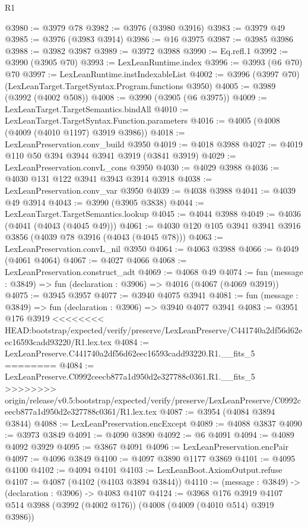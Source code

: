 \begin{lexlean}{R1}
\begin{coremodule}
{{{{{{{{{{{{{{{{{{{{{{{{{{{{{{{{{{{{{{{{{{{{{{{{{{{{{{{{{{{{{{{{{{{{{{{{{{{{{{{{{{{{{{{{{{{{{{{{{{{{{{{{{{{{{{{{{{{{{{{{{{{{{{{{{{{{{{{{{{{{{{{{{{{{{{{{{{{{{{{{{{{{{{{{{{{{{{{{{{{{{{{{{{@3980 := @3979 @78
@3982 := @3976 (@3980 @3916)
@3983 := @3979 @49
@3985 := @3976 (@3983 @3914)
@3986 := @16 @3975
@3987 := @3985 @3986
@3988 := @3982 @3987
@3989 := @3972 @3988
@3990 := Eq.refl.{1}
@3992 := @3990 (@3905 @70)
@3993 := LexLeanRuntime.index
@3996 := @3993 (@6 @70) @70
@3997 := LexLeanRuntime.instIndexableList
@4002 := @3996 (@3997 @70) (LexLeanTarget.TargetSyntax.Program.functions @3950)
@4005 := @3989 (@3992 (@4002 @508))
@4008 := @3990 (@3905 (@6 @3975))
@4009 := LexLeanTarget.TargetSemantics.bindAll
@4010 := LexLeanTarget.TargetSyntax.Function.parameters
@4016 := @4005 (@4008 (@4009 (@4010 @1197) @3919 @3986))
@4018 := LexLeanPreservation.conv_build @3950
@4019 := @4018 @3988
@4027 := @4019 @110 @50 @394 @3944 @3941 @3919 (@3841 @3919)
@4029 := LexLeanPreservation.convL_cons @3950
@4030 := @4029 @3988
@4036 := @4030 @131 @122 @3941 @3943 @3914 @3918
@4038 := LexLeanPreservation.conv_var @3950
@4039 := @4038 @3988
@4041 := @4039 @49 @3914
@4043 := @3990 (@3905 @3838)
@4044 := LexLeanTarget.TargetSemantics.lookup
@4045 := @4044 @3988
@4049 := @4036 (@4041 (@4043 (@4045 @49)))
@4061 := @4030 @120 @105 @3941 @3941 @3916 @3856 (@4039 @78 @3916 (@4043 (@4045 @78)))
@4063 := LexLeanPreservation.convL_nil @3950
@4064 := @4063 @3988
@4066 := @4049 (@4061 @4064)
@4067 := @4027 @4066
@4068 := LexLeanPreservation.construct_adt
@4069 := @4068 @49
@4074 := fun (message : @3849) => fun (declaration : @3906) => @4016 (@4067 (@4069 @3919))
@4075 := @3945 @3957
@4077 := @3940 @4075 @3941
@4081 := fun (message : @3849) => fun (declaration : @3906) => @3940 @4077 @3941
@4083 := @3951 @176 @3919
<<<<<<<< HEAD:bootstrap/expected/verify/preserve/LexLeanPreserve/C441740a2df56d62eec16593cadd93220/R1.lex.tex
@4084 := LexLeanPreserve.C441740a2df56d62eec16593cadd93220.R1.__fits_5
========
@4084 := LexLeanPreserve.C0992ceecb877a1d950d2e327788c0361.R1.__fits_5
>>>>>>>> origin/release/v0.5:bootstrap/expected/verify/preserve/LexLeanPreserve/C0992ceecb877a1d950d2e327788c0361/R1.lex.tex
@4087 := @3954 (@4084 @3894 @3844)
@4088 := LexLeanPreservation.encExcept
@4089 := @4088 @3837
@4090 := @3973 @3849
@4091 := @4090 @3890
@4092 := @6 @4091
@4094 := @4089 @4092 @3929
@4095 := @3867 @4091
@4096 := LexLeanPreservation.encPair
@4097 := @4096 @3849
@4100 := @4097 @3890 @1177 @3869
@4101 := @4095 @4100
@4102 := @4094 @4101
@4103 := LexLeanBoot.AxiomOutput.refuse
@4107 := @4087 (@4102 (@4103 @3894 @3844))
@4110 := (message : @3849) -> (declaration : @3906) -> @4083 @4107
@4124 := @3968
    @176
    @3919
    @4107
    @514
    @3988
    (@3992 (@4002 @176))
    (@4008 (@4009 (@4010 @514) @3919 @3986))
}}}}}}}}}}}}}}}}}}}}}}}}}}}}}}}}}}}}}}}}}}}}}}}}}}}}}}}}}}}}}}}}}}}}}}}}}}}}}}}}}}}}}}}}}}}}}}}}}}}}}}}}}}}}}}}}}}}}}}}}}}}}}}}}}}}}}}}}}}}}}}}}}}}}}}}}}}}}}}}}}}}}}}}}}}}}}}}}}}}}}}}}}}
\end{coremodule}
\end{lexlean}
